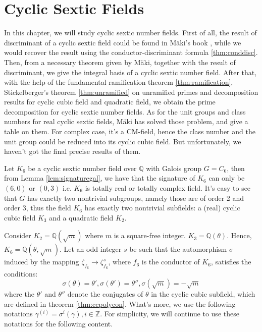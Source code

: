 \chapter{Cyclic Sextic Fields}
\label{chap:chap-six}
In this chapter, we will study cyclic sextic number fields. First of all, the result of discriminant of a cyclic sextic field could be found in M\"{a}ki's book \citep{maki1980determination}, while we would recover the result using the conductor-discriminant formula \ref{thm:conddisc}. Then, from a necessary theorem given by M\"{a}ki, together with the result of discriminant, we give the integral basis of a cyclic sextic number field. After that, with the help of the fundamental ramification theorem \ref{thm:ramification}, Stickelberger's theorem \ref{thm:unramified} on unramified primes and decomposition results for cyclic cubic field and quadratic field, we obtain the prime decomposition for cyclic sextic number fields. As for the unit groups and class numbers for real cyclic sextic fields, M\"{a}ki has solved those problem, and give a table on them. For complex case, it's a CM-field, hence the class number and the unit group could be reduced into its cyclic cubic field. But unfortunately, we haven't got the final precise results of them.

Let $K_6$ be a cyclic sextic number field over $\mathbb{Q}$ with Galois group $G=C_6$, then from Lemma \ref{lem:signaturegal}, we have that the signature of $K_6$ can only be $(6,0)$ or $(0,3)$ i.e. $K_6$ is totally real or totally complex field. It's easy to see that $G$ has exactly two nontrivial subgroups, namely those are of order 2 and order 3, thus the field $K_6$ has exactly two nontrivial subfields: a (real) cyclic cubic field $K_3$ and a quadratic field $K_2$.

Consider $K_2=\mathbb{Q}(\sqrt{m})$ where $m$ is a square-free integer. $K_3=\mathbb{Q}(\theta)$. Hence, $K_6=\mathbb{Q}(\theta,\sqrt{m})$. Let an odd integer $s$ be such that the automorphism $\sigma$ induced by the mapping $\zeta_{f_6}\rightarrow \zeta_{f_6}^s$, where $f_6$ is the conductor of $K_6$, satisfies the conditions:
$$\sigma(\theta)=\theta',\sigma(\theta')=\theta'',\sigma(\sqrt{m})=-\sqrt{m}$$
where the $\theta'$ and $\theta''$ denote the conjugates of $\theta$ in the cyclic cubic subfield, which are defined in theorem \ref{thm:ccpolycon}. What's more, we use the following notations $\gamma^{(i)}=\sigma^{i}(\gamma), i\in\mathbb{Z}$. For simplicity, we will continue to use these notations for the following content.


